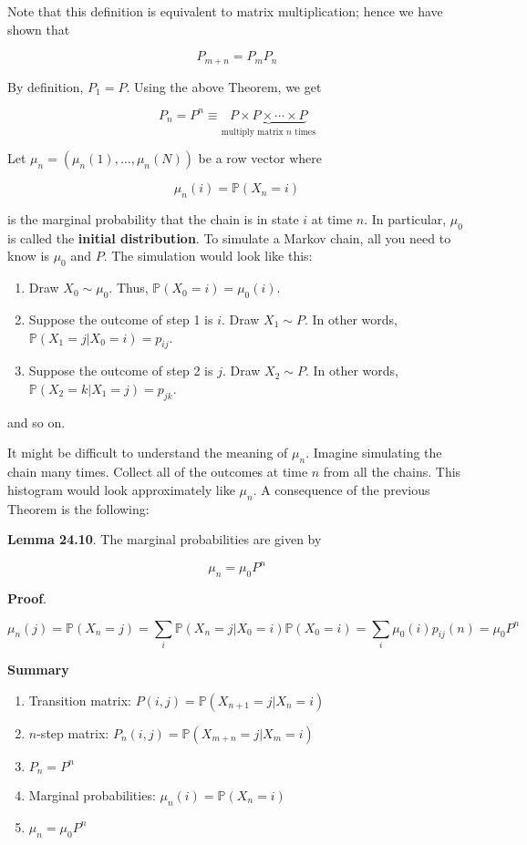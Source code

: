 Note that this definition is equivalent to matrix multiplication; hence
we have shown that

\[ P_{m + n} = P_m P_{n} \]

By definition, \(P_{1} = P\). Using the above Theorem, we get

\[ P_{n} = P^{n} \equiv \underbrace{P \times P \times \cdots \times P}_{\text{multiply matrix } n \text{ times}} \]

Let \(\mu_{n} = (\mu_{n}(1), \dots, \mu_{n}(N))\) be a row vector where

\[ \mu_{n}(i) = \mathbb{P}(X_{n} = i) \]

is the marginal probability that the chain is in state \(i\) at time
\(n\). In particular, \(\mu_{0}\) is called the \textbf{initial
distribution}. To simulate a Markov chain, all you need to know is
\(\mu_{0}\) and \(P\). The simulation would look like this:

\begin{enumerate}[tightlist,label={\arabic*.}]
\item
  Draw \(X_{0} \sim \mu_{0}\). Thus, \(\mathbb{P}(X_{0} = i) = \mu_{0}(i)\).
\item
  Suppose the outcome of step 1 is \(i\). Draw \(X_{1} \sim P\). In other
  words, \(\mathbb{P}(X_{1} = j | X_{0} = i) = p_{ij}\).
\item
  Suppose the outcome of step 2 is \(j\). Draw \(X_{2} \sim P\). In other
  words, \(\mathbb{P}(X_{2} = k | X_{1} = j) = p_{jk}\).
\end{enumerate}

and so on.

It might be difficult to understand the meaning of \(\mu_{n}\). Imagine
simulating the chain many times. Collect all of the outcomes at time
\(n\) from all the chains. This histogram would look approximately like
\(\mu_{n}\). A consequence of the previous Theorem is the following:

\textbf{Lemma 24.10}. The marginal probabilities are given by

\[ \mu_{n} = \mu_{0} P^{n} \]

\textbf{Proof}.

\[ \mu_{n}(j) = \mathbb{P}(X_{n} = j) = \sum_{i} \mathbb{P}(X_{n} = j | X_{0} = i) \mathbb{P}(X_{0} = i) = \sum_{i} \mu_{0}(i) p_{ij}(n) = \mu_{0} P^{n} \]

\textbf{Summary}

\begin{enumerate}[tightlist,label={\arabic*.}]
\item
  Transition matrix: \(P(i, j) = \mathbb{P}(X_{n+1} = j | X_{n} = i)\)
\item
  \(n\)-step matrix: \(P_{n}(i, j) = \mathbb{P}(X_{m+n} = j | X_m = i)\)
\item
  \(P_{n} = P^{n}\)
\item
  Marginal probabilities: \(\mu_{n}(i) = \mathbb{P}(X_{n} = i)\)
\item
  \(\mu_{n} = \mu_{0} P^{n}\)
\end{enumerate}

